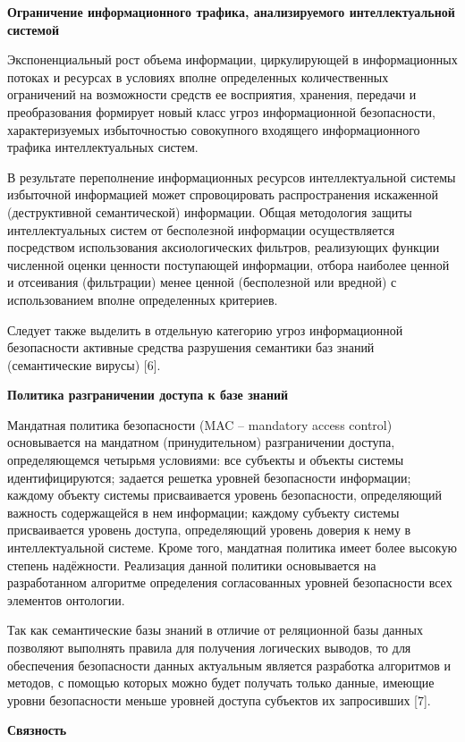 \textbf{Ограничение информационного трафика, анализируемого интеллектуальной системой}

Экспоненциальный рост объема информации, циркулирующей в информационных потоках и ресурсах в условиях вполне определенных количественных ограничений на возможности средств ее восприятия, хранения, передачи и преобразования формирует новый класс угроз информационной безопасности, характеризуемых избыточностью совокупного входящего информационного трафика интеллектуальных систем.

В результате переполнение информационных ресурсов интеллектуальной системы избыточной информацией может спровоцировать распространения искаженной (деструктивной семантической) информации. Общая методология защиты интеллектуальных систем от бесполезной информации осуществляется посредством использования аксиологических фильтров, реализующих функции численной оценки ценности поступающей информации, отбора наиболее ценной и отсеивания (фильтрации) менее ценной (бесполезной или вредной) с использованием вполне определенных критериев.

Следует также выделить в отдельную категорию угроз информационной безопасности активные средства разрушения семантики баз знаний (семантические вирусы) {[}6{]}.

\textbf{Политика разграничении доступа к базе знаний}

Мандатная политика безопасности (MAC -- mandatory access control) основывается на мандатном (принудительном) разграничении доступа, определяющемся четырьмя условиями: все субъекты и объекты системы идентифицируются; задается решетка уровней безопасности информации; каждому объекту системы присваивается уровень безопасности, определяющий важность содержащейся в нем информации; каждому субъекту системы присваивается уровень доступа, определяющий уровень доверия к нему в интеллектуальной системе. Кроме того, мандатная политика имеет более высокую степень надёжности. Реализация данной политики основывается на разработанном алгоритме определения согласованных уровней безопасности всех элементов онтологии.

Так как семантические базы знаний в отличие от реляционной базы данных позволяют выполнять правила для получения логических выводов, то для обеспечения безопасности данных актуальным является разработка алгоритмов и методов, с помощью которых можно будет получать только данные, имеющие уровни безопасности меньше уровней доступа субъектов их запросивших {[}7{]}.

\textbf{Связность}

